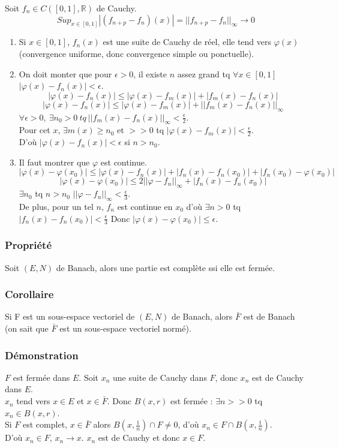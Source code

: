 \documentclass[a4paper, oneside]{report}
\newcommand{\R}{\mathbb{R}}
\newcommand{\sev}{sous-espace vectoriel }
\newcommand{\fracun}[1]{\frac{1}{#1}}
\begin{document}
\begin{enumerate}
Soit $f_n\in C([0,1],\R)$ de Cauchy.
$$Sup_{x\in [0,1]} |(f_{n+p}-f_n)(x)| = ||f_{n+p}-f_n||_\infty \rightarrow 0$$
\begin{enumerate}
\item Si $x\in [0,1]$, $f_n(x)$ est une suite de Cauchy de réel, elle tend vers $\varphi(x)$ (convergence uniforme, donc convergence simple ou ponctuelle).\\
\item On doit monter que pour $\epsilon >0$, il existe $n$ assez grand tq $\forall x\in [0,1]$ $|\varphi(x)-f_n(x)|<\epsilon$.\\
$$|\varphi(x)-f_n(x)| \leq |\varphi(x)-f_m(x)|+|f_m(x)-f_n(x)|$$
$$|\varphi(x)-f_n(x)| \leq  |\varphi(x)-f_m(x)|+||f_m(x)-f_n(x)||_\infty$$
$\forall \epsilon >0,~ \exists n_0>0~tq~||f_m(x)-f_n(x)||_\infty < \frac{\epsilon}{2}$.\\
Pour cet $x$, $\exists m(x)\geq n_0$ et $>>0$ tq $|\varphi(x)-f_m(x)|< \frac{\epsilon}{2}$.\\
D'où $|\varphi(x)-f_n(x)|< \epsilon$ si $n>n_0$.\\
\item Il faut montrer que $\varphi$ est continue.
$$|\varphi(x)-\varphi(x_0)|\leq  |\varphi(x)-f_n(x)|+|f_n(x)-f_n(x_0)|+|f_n(x_0)-\varphi(x_0)|$$
$$|\varphi(x)-\varphi(x_0)|\leq 2 ||\varphi - f_n||_\infty + |f_n(x)-f_n(x_0)|$$
$\exists n_0$ tq $n>n_0$ $||\varphi -f_n||_\infty <\frac{\epsilon}{3}$.\\
De plus, pour un tel $n$, $f_n$ est continue en $x_0$ d'où $\exists n>0$ tq $|f_n(x)-f_n(x_0)|<\frac{\epsilon}{3}$
Donc $|\varphi(x)-\varphi(x_0)|\leq \epsilon$.
\end{enumerate}
\end{enumerate}

\subsubsection{Propriété}

Soit $(E,N)$ de Banach, alors une partie est complète ssi elle est fermée.\\

\subsubsection{Corollaire}
Si F est un \sev de $(E,N)$ de Banach, alors $\bar{F}$ est de Banach (on sait que $\bar{F}$ est un \sev normé).

\subsubsection{Démonstration}
$F$ est fermée dans $E$. Soit $x_n$ une suite de Cauchy dans $F$, donc $x_n$ est de Cauchy dans $E$.\\
$x_n$ tend vers $x \in E$ et $x\in \bar{F}$. Donc $B(x,r)$ est fermée : $\exists n>>0$ tq $x_n\in B(x,r)$.\\
Si $F$ est complet, $x\in \bar{F}$ alors $B(x,\fracun{n}) \cap F \neq 0$, d'où $x_n \in F\cap B(x,\fracun{n})$.\\
D'où $x_n\in F$, $x_n\rightarrow x$. $x_n$ est de Cauchy et donc $x\in F$.
\end{document}
